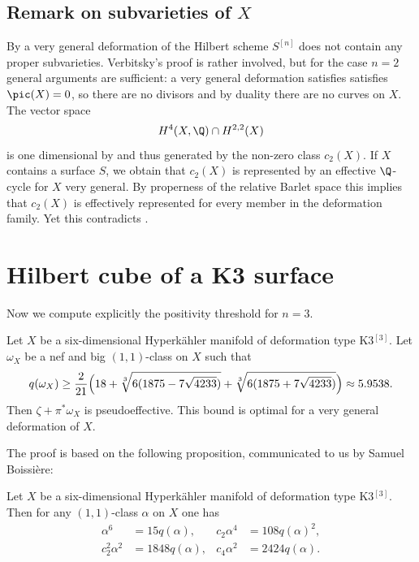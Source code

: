 \subsection{Remark on subvarieties of $X$}

By \cite[Th.\,1.1]{Ver98} a very general deformation of the Hilbert scheme $S^{[n]}$
does not contain any proper subvarieties. Verbitsky's proof is rather involved,
but for the case $n=2$ general arguments are sufficient:
a very general deformation satisfies satisfies $\pic(X)=0$, so there are no
divisors and by duality there are no curves on $X$.
The vector space
\[
H^4(X,\Q) \cap H^{2,2}(X)
\]
is one dimensional by \cite[Table\,B.1]{Zha15} and thus generated by the non-zero class $c_2(X)$.
If $X$ contains a surface $S$, we obtain that $c_2(X)$ is represented by an effective $\Q$-cycle for $X$ very general.
By properness of the relative Barlet space \cite[Th.\,4.3]{Fujiki78} this implies that $c_2(X)$ is effectively
represented for every member in the deformation family. Yet this contradicts \cite[Prop.\,2]{Ott15}.

\section{Hilbert cube of a K3 surface}

Now we compute explicitly the positivity threshold for $n=3$.

\begin{corollary} \label{corollaryK3cube}
Let $X$ be a six-dimensional Hyperkähler manifold of deformation type K3$^{[3]}$.
Let $\omega_X$ be a nef and big $(1,1)$-class on $X$ such that
\[
q(\omega_X)\geq \frac{2}{21}\Bigl(18+\sqrt[3]{6(1875-7\sqrt{4233})}+\sqrt[3]{6(1875+7\sqrt{4233})}\Bigr) \approx 5.9538.
\]
Then $\zeta+\pi^*\omega_X$ is pseudoeffective.
This bound is optimal for a very general deformation of $X$.
\end{corollary}

The proof is based on the following proposition, communicated to us by Samuel Boissière:

\begin{proposition}[S.\,Boissière] \label{propositionK3cube}
Let $X$ be a six-dimensional Hyperkähler manifold of deformation type K3$^{[3]}$. Then for any $(1,1)$-class
$\alpha$ on $X$ one has
\begin{align*}
\alpha^6&=15q(\alpha), & c_2 \alpha^4&=108q(\alpha)^2,
\\
c_2^2 \alpha^2&=1848 q(\alpha), & c_4 \alpha^2&=2424 q(\alpha).
\end{align*}
\end{proposition}

